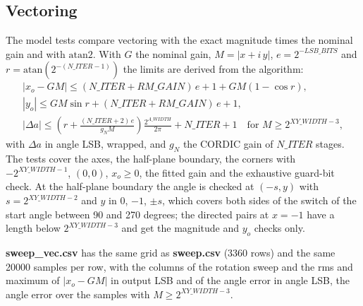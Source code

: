 \documentclass[a4paper, 12pt, notitlepage]{report}
\newcommand{\file}[1]{\textbf{#1}}
\begin{document}
\subsection{Vectoring}
The model tests compare vectoring with the exact magnitude times the nominal gain and with
$\mathrm{atan2}$. With $G$ the nominal gain, $M = |x + i\,y|$, $e = 2^{-LSB\_BITS}$ and
$r = \mathrm{atan}(2^{-(N\_ITER-1)})$ the limits are derived from the algorithm:
\[
\begin{array}{l}
   |x_o - G M| \le (N\_ITER + RM\_GAIN)\,e + 1 + G M (1 - \cos r),\\[2pt]
   |y_o| \le G M \sin r + (N\_ITER + RM\_GAIN)\,e + 1,\\[2pt]
   |\Delta a| \le \left(r + \frac{(N\_ITER+2)\,e}{g_N M}\right)\frac{2^{A\_WIDTH}}{2\pi} + N\_ITER + 1
   \quad\mbox{for } M \ge 2^{XY\_WIDTH-3},
\end{array}
\]
with $\Delta a$ in angle LSB, wrapped, and $g_N$ the CORDIC gain of $N\_ITER$ stages. The tests cover the axes,
the half-plane boundary, the corners with $-2^{XY\_WIDTH-1}$, $(0, 0)$, $x_o \ge 0$, the fitted gain and
the exhaustive guard-bit check. At the half-plane boundary the angle is checked at $(-s, y)$ with
$s = 2^{XY\_WIDTH-2}$ and $y$ in $0$, $-1$, $\pm s$, which covers both sides of the switch of the start angle between
90 and 270 degrees; the directed pairs at $x = -1$ have a length below $2^{XY\_WIDTH-3}$ and get the magnitude and
$y_o$ checks only.

\file{sweep\_vec.csv} has the same grid as \file{sweep.csv} (3360 rows) and the same 20000 samples per row, with the
columns of the rotation sweep and the rms and maximum of $|x_o - G M|$ in output LSB and of the angle error in angle
LSB, the angle error over the samples with $M \ge 2^{XY\_WIDTH-3}$.
\end{document}
